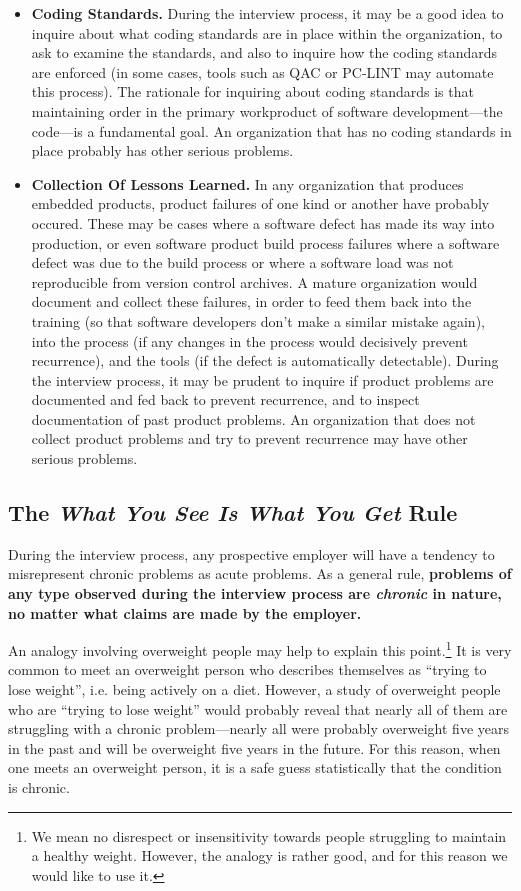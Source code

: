 \begin{itemize}
\item \textbf{Coding Standards.}  
      During the interview process, it may be a good idea to inquire about
	  what coding standards are in place within the organization, to 
	  ask to examine the standards, and also to inquire how the coding
	  standards are enforced (in some cases, tools such as QAC or
	  PC-LINT may automate this
	  process).  The rationale for inquiring about coding standards
	  is that maintaining order in the primary workproduct of
	  software development---the code---is a fundamental goal.
	  An organization that has no coding standards in place probably
	  has other serious problems.
\item \textbf{Collection Of Lessons Learned.}
      In any organization that produces embedded products, product failures
	  of one kind or another have probably occured.  These may be cases
	  where a software defect has made its way into production, or even
	  software product build process failures where a software defect
	  was due to the build process or where a software load was not
	  reproducible from version control archives.  A mature organization
	  would document and collect these failures, in order to feed them
	  back into the training (so that software developers don't make a
	  similar mistake again), into the process (if any changes in the process
	  would decisively prevent recurrence), and the tools (if the defect
	  is automatically detectable).  During the interview process, 
	  it may be prudent to inquire if product problems are documented
	  and fed back to prevent recurrence, and to inspect documentation
	  of past product problems.  An organization that does not collect
	  product problems and try to prevent recurrence may have other
	  serious problems.
\end{itemize}

\subsection{The \emph{What You See Is What You Get} Rule}

During the interview process, any prospective employer will have a tendency
to misrepresent chronic problems as acute problems.  As a general rule,
\textbf{problems of any type observed during the interview process are
\emph{chronic} in nature, no matter what claims are made by the employer.}

An analogy involving overweight people may help to explain this point.\footnote{We
mean no disrespect or insensitivity towards people struggling to maintain a
healthy weight.  However, the analogy is rather good, and for this reason
we would like to use it.}  It is very common to meet an overweight person
who describes themselves as ``trying to lose weight'', i.e. being actively
on a diet.  However, a study of overweight people who are ``trying to 
lose weight'' would probably reveal that nearly all of them are struggling
with a chronic problem---nearly all were probably overweight five years
in the past and will be overweight five years in the future.  For this reason,
when one meets an overweight person, it is a safe guess statistically that
the condition is chronic.

